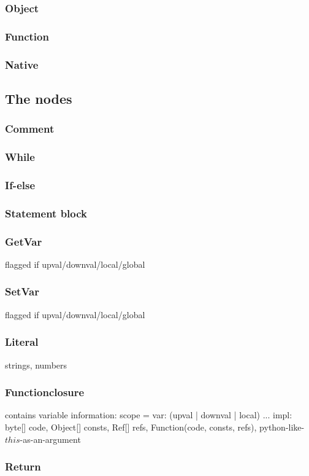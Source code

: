 \subsubsection{Object}
\subsubsection{Function}
\subsubsection{Native}
\subsection{The nodes}

\subsubsection{Comment}

\subsubsection{While}
\subsubsection{If-else}
\subsubsection{Statement block}
\subsubsection{GetVar}
flagged if upval/downval/local/global
\subsubsection{SetVar}
flagged if upval/downval/local/global
\subsubsection{Literal}
strings, numbers
\subsubsection{Functionclosure}
contains variable information: scope = {var: (upval | downval | local) ... }
impl: byte[] code, Object[] consts, Ref[] refs, Function(code, consts, refs), 
python-like-$this$-as-an-argument
\subsubsection{Return}
